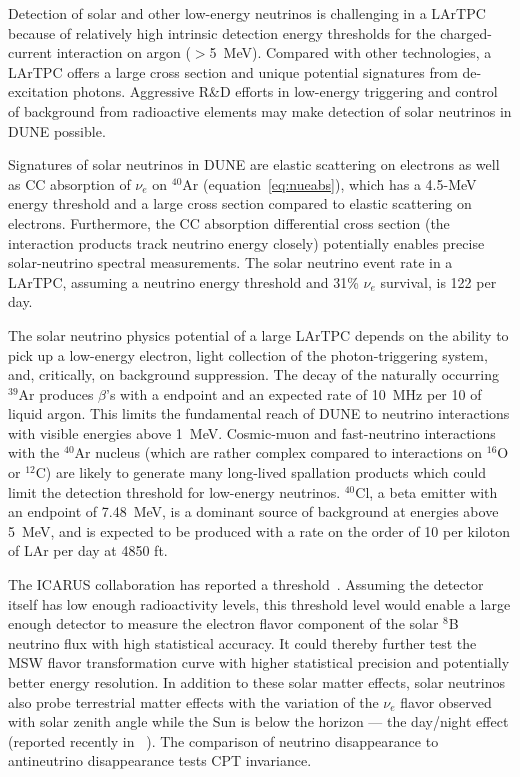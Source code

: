 Detection of solar and other low-energy neutrinos is challenging in
a LArTPC because of relatively high intrinsic detection energy thresholds for
the charged-current interaction on argon ($>$\SI{5}{\MeV}). 
Compared with other technologies, a LArTPC offers a large
cross section and unique potential signatures from de-excitation
photons. Aggressive R\&D efforts in low-energy triggering and
control of background from radioactive elements may make detection
of solar neutrinos in DUNE possible.

Signatures of solar neutrinos in DUNE
are elastic scattering on electrons as well as CC absorption of $\nu_e$ on $^{40}$Ar (equation~\ref{eq:nueabs}), which has a 4.5-MeV energy threshold and a large cross section compared to elastic scattering on electrons.  Furthermore, the CC absorption differential cross section (the interaction products track neutrino energy closely) potentially enables precise solar-neutrino spectral measurements.
The solar neutrino event rate in a
 LArTPC, assuming a  neutrino energy
threshold and 31\% $\nu_e$ survival, is 122 per day.


The solar neutrino physics potential of a large LArTPC depends
on the ability to pick up a low-energy electron, light collection of the photon-triggering system,
and, critically, on background suppression. 
The decay of the naturally occurring $^{39}$Ar
produces $\beta$'s with a  endpoint and an expected rate
of \SI{10}{\MHz} per \SI{10}{\kt} of liquid argon. This limits the
fundamental reach of DUNE to neutrino interactions with visible
energies above \SI{1}{\MeV}. 
Cosmic-muon and fast-neutrino  interactions with the $^{40}$Ar nucleus (which are rather complex
compared to interactions on $^{16}$O or $^{12}$C) are likely to generate many long-lived spallation products which could limit the
detection threshold for low-energy neutrinos.
$^{40}$Cl, a beta emitter with an
endpoint of \SI{7.48}{\MeV}, is a dominant source of background at
energies above \SI{5}{\MeV}, and is expected to be produced with a rate on the order of 10 per kiloton of LAr per day at 4850 ft.



The ICARUS collaboration has reported a 
threshold~\cite{Guglielmi:2012}. Assuming the detector itself
has low enough radioactivity levels, this threshold level would enable
a large enough detector to measure the electron flavor component of
the solar $^8$B neutrino flux with high statistical accuracy. It could 
thereby further test the MSW flavor transformation curve with higher statistical precision and
potentially better energy resolution. 
In addition to these solar
matter effects, solar 
neutrinos also probe terrestrial matter effects
with the variation of the $\nu_e$ flavor observed with solar zenith
angle while the Sun is below the horizon --- the day/night effect (reported recently in ~\cite{Renshaw:2013dzu}). 
The comparison
of neutrino disappearance to antineutrino disappearance tests CPT
invariance. 


